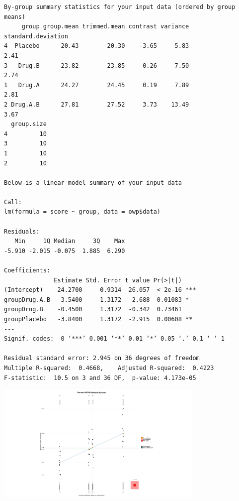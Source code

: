 \begin{frame}
\begin{enumerate}
\begin{verbatim}
By-group summary statistics for your input data (ordered by group means)
     group group.mean trimmed.mean contrast variance standard.deviation
4  Placebo      20.43        20.30    -3.65     5.83               2.41
3   Drug.B      23.82        23.85    -0.26     7.50               2.74
1   Drug.A      24.27        24.45     0.19     7.89               2.81
2 Drug.A.B      27.81        27.52     3.73    13.49               3.67
  group.size
4         10
3         10
1         10
2         10

Below is a linear model summary of your input data

Call:
lm(formula = score ~ group, data = owp$data)

Residuals:
   Min     1Q Median     3Q    Max 
-5.910 -2.015 -0.075  1.885  6.290 

Coefficients:
              Estimate Std. Error t value Pr(>|t|)    
(Intercept)    24.2700     0.9314  26.057  < 2e-16 ***
groupDrug.A.B   3.5400     1.3172   2.688  0.01083 *  
groupDrug.B    -0.4500     1.3172  -0.342  0.73461    
groupPlacebo   -3.8400     1.3172  -2.915  0.00608 ** 
---
Signif. codes:  0 ‘***’ 0.001 ‘**’ 0.01 ‘*’ 0.05 ‘.’ 0.1 ‘ ’ 1

Residual standard error: 2.945 on 36 degrees of freedom
Multiple R-squared:  0.4668,	Adjusted R-squared:  0.4223 
F-statistic:  10.5 on 3 and 36 DF,  p-value: 4.173e-05

\end{verbatim}
\begin{center}
\includegraphics[width=10cm]{img/aovgr2.png}
\end{center}
  \end{enumerate}
\end{frame}

